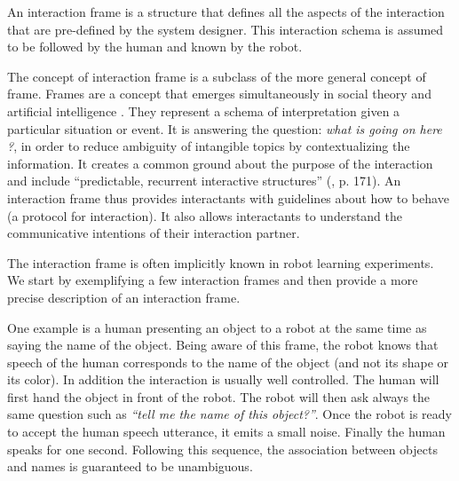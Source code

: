 An interaction frame is a structure that defines all the aspects of the interaction that are pre-defined by the system designer. This interaction schema is assumed to be followed by the human and known by the robot.

The concept of interaction frame is a subclass of the more general concept of frame. Frames are a concept that emerges simultaneously in social theory \cite{goffman1974frame} and artificial intelligence \cite{minsky1974framework}. They represent a schema of interpretation given a particular situation or event. It is answering the question: \emph{what is going on here ?}, in order to reduce ambiguity of intangible topics by contextualizing the information. It creates a common ground about the purpose of the interaction \cite{tomasello2009cultural,rohlfing2013learning} and include ``predictable, recurrent interactive structures'' (\cite{ninio1996pragmatic}, p. 171). An interaction frame thus provides interactants with guidelines about how to behave (a protocol for interaction). It also allows interactants to understand the communicative intentions of their interaction partner.

The interaction frame is often implicitly known in robot learning experiments. We start by exemplifying a few interaction frames and then provide a more precise description of an interaction frame.

One example is a human presenting an object to a robot at the same time as saying the name of the object. Being aware of this frame, the robot knows that speech of the human corresponds to the name of the object (and not its shape or its color). In addition the interaction is usually well controlled. The human will first hand the object in front of the robot. The robot will then ask always the same question such as \emph{``tell me the name of this object?''}. Once the robot is ready to accept the human speech utterance, it emits a small noise.  Finally the human speaks for one second. Following this sequence, the association between objects and names is guaranteed to be unambiguous.

